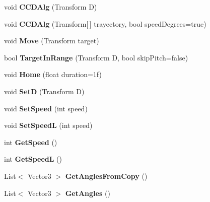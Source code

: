 \begin{DoxyCompactItemize}
\item 
\mbox{\label{class_i_k_aa28704730e12709936ba319e326a4173}} 
void {\bfseries C\+C\+D\+Alg} (Transform D)
\item 
\mbox{\label{class_i_k_a50a313a48866039ae19374abe27edfd0}} 
void {\bfseries C\+C\+D\+Alg} (Transform\mbox{[}$\,$\mbox{]} trayectory, bool speed\+Degrees=true)
\item 
\mbox{\label{class_i_k_a9959bf459122a560124c9aac8191cbe6}} 
void {\bfseries Move} (Transform target)
\item 
\mbox{\label{class_i_k_ad97122f89dfb2c5bff5605cbcf5c5cc7}} 
bool {\bfseries Target\+In\+Range} (Transform D, bool skip\+Pitch=false)
\item 
\mbox{\label{class_i_k_a1a8f3eb230e800c10dec985b81623121}} 
void {\bfseries Home} (float duration=1f)
\item 
\mbox{\label{class_i_k_aa97be23f240e84f80c9d1709877e46f4}} 
void {\bfseries SetD} (Transform D)
\item 
\mbox{\label{class_i_k_af3fe9338cf146836289725c4d7f001ff}} 
void {\bfseries Set\+Speed} (int speed)
\item 
\mbox{\label{class_i_k_afc1472fadfc08f9df7374af09ca83110}} 
void {\bfseries Set\+SpeedL} (int speed)
\item 
\mbox{\label{class_i_k_a4560c82ff2f46414e095e7fb37283f39}} 
int {\bfseries Get\+Speed} ()
\item 
\mbox{\label{class_i_k_ae3121a6a82a3ae9216c480d4e9f117a9}} 
int {\bfseries Get\+SpeedL} ()
\item 
\mbox{\label{class_i_k_a041e3cba939af2806b7af200edf3161c}} 
List$<$ Vector3 $>$ {\bfseries Get\+Angles\+From\+Copy} ()
\item 
\mbox{\label{class_i_k_a47ceb1a675024943c1714072b1b0d01f}} 
List$<$ Vector3 $>$ {\bfseries Get\+Angles} ()

\end{DoxyCompactItemize}
